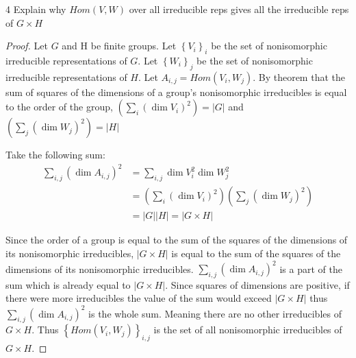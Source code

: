 \documentclass{article}
\begin{document}
\bigskip

\begin{PROB}{4}\label{Problem 4.}
    Explain why $Hom(V,W)$ over all irreducible reps gives all the irreducible reps of $G \times H$
\end{PROB}
\begin{proof}
    Let $G$ and H be finite groups.  
    Let $\left\{ V_i \right\}_i$ be the set of nonisomorphic irreducible representations of $G$. Let $\left\{ W_i \right\}_j$ be the set of nonisomorphic irreducible representations of $H$. Let $A_{i, j} = Hom(V_i, W_j)$. By theorem that the sum of squares of the dimensions of a group's nonisomorphic irreducibles is equal to the order of the group, $\left(\sum_{i} (\dim V_i)^2\right) = |G|$ and $\left(\sum_{j} (\dim W_j)^2\right) = |H|$   
    
    Take the following sum:
    \begin{align*}
        \sum_{i, j} \left(\dim A_{i, j}\right)^2 &= \sum_{i, j} \dim V_i^2 \dim W_j^2 \\
        &= \left(\sum_{i} (\dim V_i)^2\right) \left(\sum_{j} (\dim W_j)^2\right) \\
        &= |G| |H| = |G \times H|
    \end{align*}

    Since the order of a group is equal to the sum of the squares of the dimensions of its nonisomorphic irreducibles, $|G \times H|$ is equal to the sum of the squares of the dimensions of its nonisomorphic irreducibles. $\sum_{i, j} \left(\dim A_{i, j}\right)^2$ is a part of the sum which is already equal to $|G \times H|$. Since squares of dimensions are positive, if there were more irreducibles the value of the sum would exceed $|G \times H|$ thus $\sum_{i, j} \left(\dim A_{i, j}\right)^2$ is the whole sum. Meaning there are no other irreducibles of $G \times H$. Thus $\left\{ Hom(V_i, W_j) \right\}_{i, j}$ is the set of all nonisomorphic irreducibles of $G \times H$. 
\end{proof}

\bigskip
\end{document}
